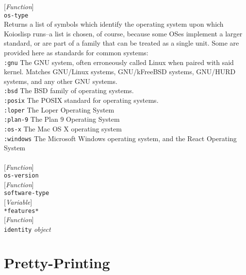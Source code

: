 \documentclass[10pt]{book}
\newenvironment{defother}[2]{[\textit{#1}]\\\texttt{#2}}{\\}
\newenvironment{defun}[1]{\begin{defother}{Function}{#1}}{\end{defother}}
\newenvironment{defvar}[1]{\begin{defother}{Variable}{#1}}{\end{defother}}
\begin{document}
\begin{defun}{os-type}\\ Returns a list of symbols which identify the operating system upon which Koioslisp runs--a list is chosen, of course, because some OSes implement a larger standard, or are part of a family that can be treated as a single unit. Some are provided here as standards for common systems:\\
\texttt{:gnu} The GNU system, often erroneously called Linux when paired with said kernel. Matches GNU/Linux systems, GNU/kFreeBSD systems, GNU/HURD systems, and any other GNU systems.\\
\texttt{:bsd} The BSD family of operating systems.\\
\texttt{:posix} The POSIX standard for operating systems.\\
\texttt{:loper} The Loper Operating System\\ %
\texttt{:plan-9} The Plan 9 Operating System\\
\texttt{:os-x} The Mac OS X operating system\\
\texttt{:windows} The Microsoft Windows operating system, and the React Operating System\\
\end{defun}
\begin{defun}{os-version}\end{defun}
\begin{defun}{software-type} %
\end{defun}
\begin{defvar}{*features*}\end{defvar}
\begin{defun}{identity} \textit{object} \end{defun}
\chapter{Pretty-Printing}
\end{document}
